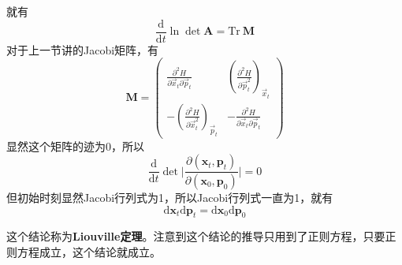     就有
    \begin{equation*}
        \frac {\mathrm{d}}{\mathrm{d}t} \ln{\det{\bm{A}}} = \mathrm{Tr}\ \bm{M}
    \end{equation*}
    对于上一节讲的Jacobi矩阵，有
    \begin{equation*}
        \bm{M} = 
        \begin{pmatrix}
        \frac {\partial^2 H}{\partial \vec{x}_t \partial \vec{p}_t} & (\frac {\partial^2 H}{\partial \vec{p}_t^2})_{\vec{x}_t}\\
        -(\frac {\partial^2 H}{\partial \vec{x}_t^2})_{\vec{p}_t} & - \frac {\partial^2 H}{\partial \vec{x}_t \partial \vec{p}_t}
        \end{pmatrix}
    \end{equation*}
    显然这个矩阵的迹为0，所以
    \begin{equation*}
        \frac {\mathrm{d}}{\mathrm{d}t} \det \bigg|\frac {\partial (\bm{x}_t,\bm{p}_t)}{\partial (\bm{x}_0,\bm{p}_0)} \bigg| = 0
    \end{equation*}
    但初始时刻显然Jacobi行列式为1，所以Jacobi行列式一直为1，就有
    \begin{equation*}
        \mathrm{d}\bm{x}_t \mathrm{d}\bm{p}_t = \mathrm{d}\bm{x}_0 \mathrm{d}\bm{p}_0
    \end{equation*}

    这个结论称为\textbf{Liouville定理}。注意到这个结论的推导只用到了正则方程，只要正则方程成立，这个结论就成立。

